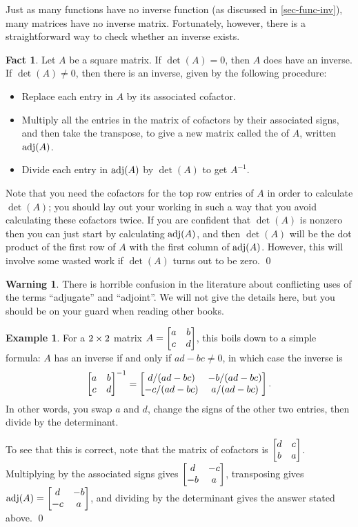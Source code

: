 \documentclass[a4paper]{book}
\theoremstyle{definition}
\newtheorem{fact}[theorem]{Fact}
\newtheorem{warning}[theorem]{Warning}
\newtheorem{example}[theorem]{Example}
\begin{document}
Just as many functions have no inverse function (as discussed in
\autoref{sec-func-inv}), many matrices have no inverse matrix.
Fortunately, however, there is a straightforward way to check whether
an inverse exists.
\begin{fact}
 Let $A$ be a square matrix.  If $\det(A)=0$, then $A$ does 
 have an inverse.  If $\det(A)\neq 0$, then there is an inverse, given
 by the following procedure:
 \begin{itemize}
  \item Replace each entry in $A$ by its associated cofactor.
  \item Multiply all the entries in the matrix of cofactors by their
   associated signs, and then take the transpose, to give a new matrix
   called the  of $A$, written $\operatorname{adj}(A)$.
  \item Divide each entry in $\operatorname{adj}(A)$ by $\det(A)$ to get $A^{-1}$.
 \end{itemize}
 Note that you need the cofactors for the top row entries of $A$ in
 order to calculate $\det(A)$; you should lay out your working in such
 a way that you avoid calculating these cofactors twice.  If you are
 confident that $\det(A)$ is nonzero then you can just start by
 calculating $\operatorname{adj}(A)$, and then $\det(A)$ will be the dot product of
 the first row of $A$ with the first column of $\operatorname{adj}(A)$.  However,
 this will involve some wasted work if $\det(A)$ turns out to be
 zero. \qed
\end{fact}
\begin{warning}
 There is horrible confusion in the literature about conflicting uses
 of the terms ``adjugate'' and ``adjoint''.  We will not give the
 details here, but you should be on your guard when reading other
 books.
\end{warning}
\begin{example}
 For a $2\times 2$ matrix $A=\begin{bmatrix} a&b\\ c&d\end{bmatrix}$, this boils down to a
 simple formula: $A$ has an inverse if and only if $ad-bc\neq 0$, in
 which case the inverse is
 \[ \begin{bmatrix} a&b\\ c&d\end{bmatrix}^{-1} =
     \begin{bmatrix}  d/(ad-bc) & -b/(ad-bc) \\
          -c/(ad-bc) & a/(ad-bc) \end{bmatrix}.
 \]
 In other words, you swap $a$ and $d$, change the signs of the other
 two entries, then divide by the determinant.

 To see that this is correct, note that the matrix of
 cofactors is $\begin{bmatrix} d&c\\b&a\end{bmatrix}$.  Multiplying by the associated signs
 gives $\begin{bmatrix} d&-c\\-b&a\end{bmatrix}$, transposing gives
 $\operatorname{adj}(A)=\begin{bmatrix} d&-b\\-c&a\end{bmatrix}$, and dividing by the determinant gives
 the answer stated above.
 \qed
\end{example}
\end{document}
